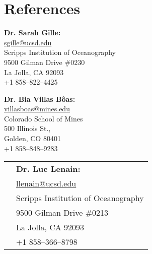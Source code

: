 \documentclass[10pt]{article}
\begin{document}
\section*{References}
\vspace{.3cm}

\begin{minipage}[ht]{0.48\textwidth}
\begin{flushleft}
\textbf{Dr. Sarah Gille:} \\
\vspace{.1cm}
\url{sgille@ucsd.edu}\\
\vspace{.2cm}
\small{Scripps Institution of Oceanography}\\
\small{9500 Gilman Drive \#0230} \\
\small{La Jolla, CA 92093} \\
\small{+1 858--822--4425} 
\end{flushleft}
\end{minipage}
\hfill
\begin{minipage}[ht]{0.48\textwidth}
\begin{flushright}
\textbf{Dr. Bia Villas B\^{o}as:} \\
\vspace{.1cm}
\url{villasboas@mines.edu}\\
\vspace{.2cm}
\small{Colorado School of Mines}\\
\small{500 Illinois St.,} \\
\small{Golden, CO 80401} \\
\small{+1 858--848--9283} 
\end{flushright}
\end{minipage}
\hfill
\begin{center}
\begin{minipage}[ht]{0.48\textwidth}
\vspace{.1cm}
\begin{center}
\begin{tabular}{l  l }
& \textbf{Dr. Luc Lenain:} \\[5pt]
& \url{llenain@ucsd.edu} \\[5pt]
&\small{Scripps Institution of Oceanography}\\
&\small{9500 Gilman Drive \#0213} \\
&\small{La Jolla, CA 92093} \\
&\small{+1 858--366--8798} 
\end{tabular}
\end{center}
\end{minipage}
\end{center}
\end{document}
